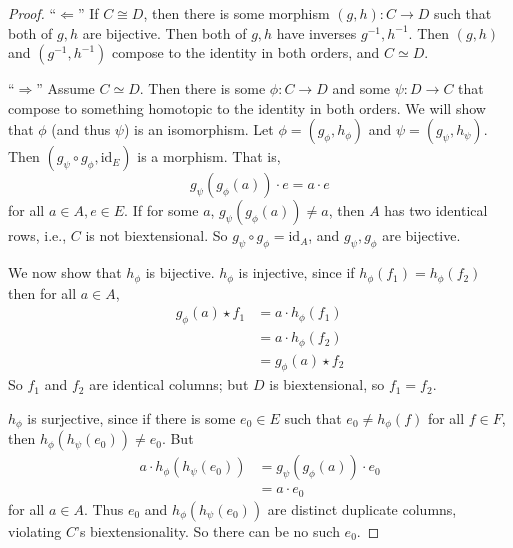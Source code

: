 \documentclass{article}
\begin{document}
\begin{proof}
``$\Leftarrow$''
If $C \cong D$, then there is some morphism $(g, h) : C \to D$ such that both of $g, h$ are bijective.
Then both of $g, h$ have inverses $g^{-1}, h^{-1}$.
Then $(g, h)$ and $(g^{-1}, h^{-1})$ compose to the identity in both orders, and $C \simeq D$.

``$\Rightarrow$''
Assume $C \simeq D$.
Then there is some $\phi : C \to D$ and some $\psi : D \to C$ that compose to something homotopic to the identity in both orders.
We will show that $\phi$ (and thus $\psi$) is an isomorphism.
Let $\phi = (g_{\phi}, h_{\phi})$ and $\psi = (g_{\psi}, h_{\psi})$.
Then $(g_{\psi} \circ g_{\phi}, \text{id}_E)$ is a morphism.
That is, 
\begin{displaymath}
g_{\psi} (g_{\phi} (a)) \cdot e =  a \cdot e
\end{displaymath}
for all $a \in A, e \in E$.
If for some $a$, $g_{\psi} (g_{\phi} (a)) \neq a$, then $A$ has two identical rows, i.e., $C$ is not biextensional.
So $g_{\psi} \circ g_{\phi} = \text{id}_A$, and $g_{\psi}, g_{\phi}$ are bijective.

We now show that $h_{\phi}$ is bijective.
$h_{\phi}$ is injective, since if $h_{\phi}(f_1) = h_{\phi}(f_2)$ then for all $a \in A$,
\begin{displaymath}
\begin{split}
    g_{\phi}(a) \star f_1 & = a \cdot h_{\phi}(f_1) \\
                          & = a \cdot h_{\phi}(f_2) \\
                          & = g_{\phi}(a) \star f_2
\end{split}
\end{displaymath}
So $f_1$ and $f_2$ are identical columns;
but $D$ is biextensional, so $f_1 = f_2$.

$h_{\phi}$ is surjective, since if there is some $e_0 \in E$ such that $e_0 \neq h_{\phi}(f)$ for all $f \in F$, then $h_{\phi}(h_{\psi}(e_0)) \neq e_0$. 
But
\begin{displaymath}
\begin{split}
 a \cdot h_{\phi}(h_{\psi}(e_0)) & = g_{\psi}(g_{\phi}(a)) \cdot e_0 \\
                                 & = a \cdot e_0   
\end{split}
\end{displaymath}
for all $a \in A$.
Thus $e_0$ and $h_{\phi}(h_{\psi}(e_0))$ are distinct duplicate columns, violating $C$'s biextensionality.
So there can be no such $e_0$.
\end{proof}
\end{document}
